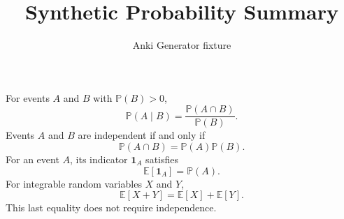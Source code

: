 \documentclass{article}
\title{Synthetic Probability Summary}
\author{Anki Generator fixture}
\date{}
\begin{document}
\maketitle

For events $A$ and $B$ with $\mathbb{P}(B)>0$,
\[
  \mathbb{P}(A\mid B)
  = \frac{\mathbb{P}(A\cap B)}{\mathbb{P}(B)}.
\]
Events $A$ and $B$ are independent if and only if
\[
  \mathbb{P}(A\cap B)=\mathbb{P}(A)\mathbb{P}(B).
\]
For an event $A$, its indicator $\mathbf{1}_A$ satisfies
\[
  \mathbb{E}[\mathbf{1}_A]=\mathbb{P}(A).
\]
For integrable random variables $X$ and $Y$,
\[
  \mathbb{E}[X+Y]=\mathbb{E}[X]+\mathbb{E}[Y].
\]
This last equality does not require independence.
\end{document}

